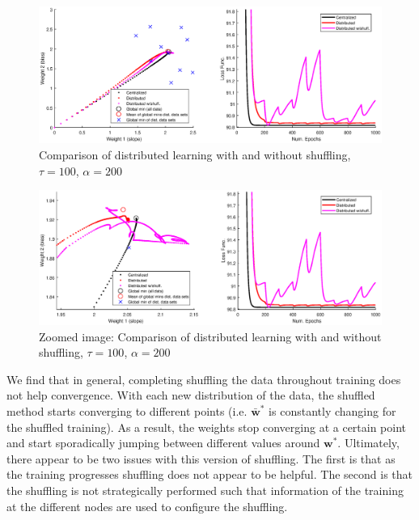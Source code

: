 \documentclass[11pt, fullpage,letterpaper]{article}
\begin{document}
\begin{enumerate}
\begin{enumerate}
         \begin{figure}[H]
\begin{center}
\advance\leftskip-3cm
\advance\rightskip-3cm
\includegraphics[width=20cm]{shuff_extreme.eps}
\caption{Comparison of distributed learning with and without shuffling, $\tau=100$, $\alpha=200$}
\end{center}\end{figure}

   \begin{figure}[H]
\begin{center}
\advance\leftskip-3cm
\advance\rightskip-3cm
\includegraphics[width=20cm]{shuff_extreme_zoom.eps}
\caption{Zoomed image: Comparison of distributed learning with and without shuffling, $\tau=100$, $\alpha=200$}
\end{center}\end{figure}

   We find that in general, completing shuffling the data throughout training does not help convergence. With each new distribution of the data, the shuffled method starts converging to different points (i.e. $\bar{\boldsymbol{w}}^*$ is constantly changing for the shuffled training). As a result, the weights stop converging at a certain point and start sporadically jumping between different values around $\boldsymbol{w}^*$. Ultimately, there appear to be two issues with this version of shuffling. The first is that as the training progresses shuffling does not appear to be helpful. The second is that the shuffling is not strategically performed such that information of the training at the different nodes are used to configure the shuffling.


\end{enumerate}
\end{enumerate}
\end{document}
